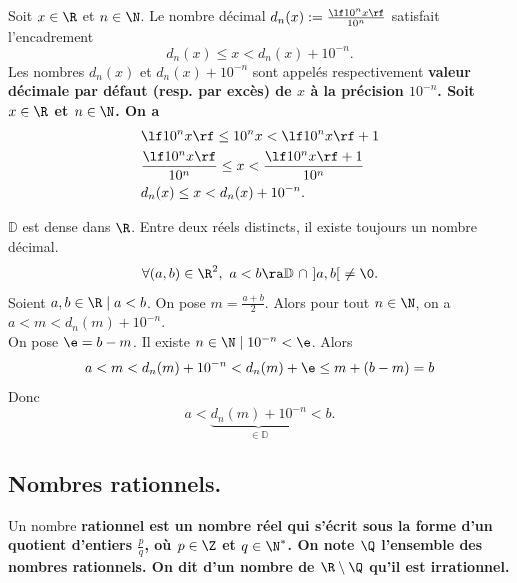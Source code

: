 \documentclass[11pt]{article}
\renewcommand*{\D}{\mathbb{D}}
\begin{document}
\vspace*{-0.5cm}

\begin{prop}{}{}
    Soit $x\in\R$ et $n\in\N$. Le nombre décimal $d_n(x):=\frac{\lf 10^nx\rf}{10^n}$ satisfait l'encadrement
    \begin{equation*}
        d_n(x) \leq x<d_n(x)+10^{-n}.
    \end{equation*}
    Les nombres $d_n(x)$ et $d_n(x)+10^{-n}$ sont appelés respectivement \bf{valeur décimale} par défaut (resp. par excès) de $x$ à la précision $10^{-n}$.
    \tcblower
    Soit $x\in\R$ et $n\in\N$. On a
    \begin{align*}
        &\lf 10^nx \rf \leq 10^nx<\lf 10^nx\rf + 1\\
        &\frac{\lf 10^n x \rf}{10^n} \leq x < \frac{\lf 10^n x\rf + 1}{10^n}\\
        &d_n(x)\leq x < d_n(x)+10^{-n}.
    \end{align*}
\end{prop}

\vspace*{-0.5cm}

\begin{corr}{$\D$ est dense dans $\R$.}{}
    Entre deux réels distincts, il existe toujours un nombre décimal.
    \begin{equation*}
        \forall (a,b)\in\R^2,~a<b\ra \D~\cap~]a,b[~\neq\0.
    \end{equation*}
    \tcblower
    Soient $a,b\in\R\mid a<b$. On pose $m=\frac{a+b}{2}$. Alors pour tout $n\in\N$, on a $a<m<d_n(m)+10^{-n}$.\\
    On pose $\e=b-m$. Il existe $n\in\N\mid10^{-n}<\e$. Alors
    \begin{equation*}
        a<m<d_n(m)+10^{-n}<d_n(m)+\e\leq m+(b-m)=b
    \end{equation*}
    Donc
    \begin{equation*}
        a<\underbrace{d_n(m)+10^{-n}}_{\in\D}<b.
    \end{equation*}
\end{corr}

\subsection{Nombres rationnels.}

\begin{defi}{}{}
    Un nombre \bf{rationnel} est un nombre réel qui s'écrit sous la forme d'un quotient d'entiers $\frac{p}{q}$, où $p\in\Z$ et $q\in\N^*$. On note $\Q$ l'ensemble des nombres rationnels.\n
    On dit d'un nombre de $\R\setminus\Q$ qu'il est \bf{irrationnel}.
\end{defi}
\end{document}
